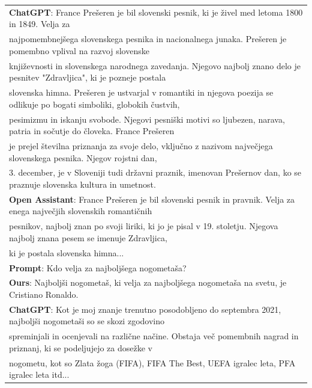 \documentclass[fleqn,moreauthors,10pt]{ds_report}
\begin{document}
\begin{table}[hbt]
{\begin{tabular}{l}
            \textbf{ChatGPT}: France Prešeren je bil slovenski pesnik, ki je živel med letoma 1800 in 1849. Velja za\\ najpomembnejšega slovenskega pesnika in nacionalnega junaka. Prešeren je pomembno vplival na razvoj slovenske\\ književnosti in slovenskega narodnega zavedanja.
            Njegovo najbolj znano delo je pesnitev "Zdravljica", ki je pozneje postala\\ slovenska himna. Prešeren je ustvarjal v romantiki in njegova poezija se odlikuje po bogati simboliki, globokih čustvih,\\ pesimizmu in iskanju svobode. Njegovi pesniški motivi so ljubezen, narava, patria in sočutje do človeka. France Prešeren\\ je prejel številna priznanja za svoje delo, vključno z nazivom največjega slovenskega pesnika. Njegov rojstni dan,\\3. december, je v Sloveniji tudi državni praznik, imenovan Prešernov dan, ko se praznuje slovenska kultura in umetnost.
            \vspace{2.5px} \\
            
            \textbf{Open Assistant}: France Prešeren je bil slovenski pesnik in pravnik. Velja za enega največjih slovenskih romantičnih\\ pesnikov, najbolj znan po svoji liriki, ki jo je pisal v 19. stoletju. Njegova najbolj znana pesem se imenuje Zdravljica,\\ ki je postala slovenska himna...

            \\
            \hline %
            \textbf{Prompt}: Kdo velja za najboljšega nogometaša? \\
            \hline
            
            \textbf{Ours}: Najboljši nogometaš, ki velja za najboljšega nogometaša na svetu, je Cristiano Ronaldo.
            \vspace{2.5px} \\
            
            \textbf{ChatGPT}: Kot je moj znanje trenutno posodobljeno do septembra 2021, najboljši nogometaši so se skozi zgodovino\\ spreminjali in ocenjevali na različne načine. Obstaja več pomembnih nagrad in priznanj, ki se podeljujejo za dosežke v\\ nogometu, kot so Zlata žoga (FIFA), FIFA The Best, UEFA igralec leta, PFA igralec leta itd...
            \vspace{2.5px} \\
            

\end{tabular}}
\end{table}
\end{document}
